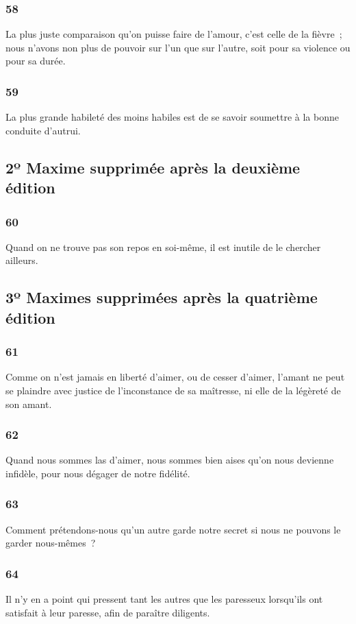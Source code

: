 \documentclass[french,twoside]{book} %
\begin{document}
\subsubsection[{58}]{ \textsc{58} }
\noindent La plus juste comparaison qu’on puisse faire de l’amour, c’est celle de la fièvre ; nous n’avons non plus de pouvoir sur l’un que sur l’autre, soit pour sa violence ou pour sa durée.
\subsubsection[{59}]{ \textsc{59} }
\noindent La plus grande habileté des moins habiles est de se savoir soumettre à la bonne conduite d’autrui.
\subsection[{2º Maxime supprimée après la deuxième édition}]{2º Maxime supprimée après la deuxième édition}
\subsubsection[{60}]{ \textsc{60} }
\noindent Quand on ne trouve pas son repos en soi-même, il est inutile de le chercher ailleurs.
\subsection[{3º Maximes supprimées après la quatrième édition}]{3º Maximes supprimées après la quatrième édition}
\subsubsection[{61}]{ \textsc{61} }
\noindent Comme on n’est jamais en liberté d’aimer, ou de cesser d’aimer, l’amant ne peut se plaindre avec justice de l’inconstance de sa maîtresse, ni elle de la légèreté de son amant.
\subsubsection[{62}]{ \textsc{62} }
\noindent Quand nous sommes las d’aimer, nous sommes bien aises qu’on nous devienne infidèle, pour nous dégager de notre fidélité.
\subsubsection[{63}]{ \textsc{63} }
\noindent Comment prétendons-nous qu’un autre garde notre secret si nous ne pouvons le garder nous-mêmes ?
\subsubsection[{64}]{ \textsc{64} }
\noindent Il n’y en a point qui pressent tant les autres que les paresseux lorsqu’ils ont satisfait à leur paresse, afin de paraître diligents.
\end{document}
